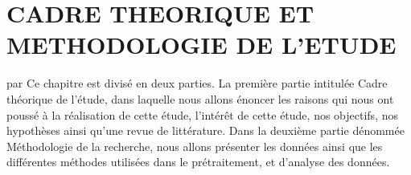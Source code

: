 \chapter{CADRE THEORIQUE ET METHODOLOGIE DE L'ETUDE}
par{
    Ce chapitre est divisé en deux parties. La première partie intitulée 
    Cadre théorique de l'étude, dans laquelle nous allons énoncer les 
    raisons qui nous ont poussé à la réalisation de cette étude, l'intérêt
    de cette étude, nos objectifs, nos hypothèses ainsi qu'une 
    revue de littérature. Dans la deuxième partie dénommée Méthodologie 
    de la recherche, nous allons présenter les données ainsi que les 
    différentes méthodes utilisées dans le prétraitement, et d'analyse 
    des données.
}


